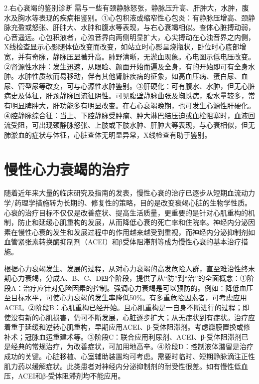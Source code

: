 2.右心衰竭的鉴别诊断
需与一些有颈静脉怒张，静脉压升高、肝肿大，水肿，腹水及胸水等表现的疾病相鉴别。①心包积液或缩窄性心包炎：有静脉压增高、颈静脉充盈或怒张、肝肿大、水肿和腹水等表现，与右心衰竭相似。查体心脏搏动弱，心音遥远。心包积液者，心浊音界向两侧明显扩大，心尖搏动在心浊音界之内侧，X线检查显示心影随体位改变而改变，如站立时心影呈烧瓶状，卧位时心底部增宽，并有奇脉，静脉压显著升高。肺野清晰，无淤血现象。心电图示低电压改变。②肾源性水肿：发生迅速，从眼睑、颜面开始而遍及全身，有的开始即可有全身水肿。水肿性质软而易移动，伴有其他肾脏疾病的征象，如高血压病、蛋白尿、血尿、管型尿等改变，可与心源性水肿鉴别。③肝硬化：可有腹水、水肿，但无心脏病史及体征，肝颈静脉回流征阴性。可见腹壁静脉曲张及蜘蛛痣，腹水量较多，常有明显脾肿大，肝功能多有明显改变。在右心衰竭晚期，也可发生心源性肝硬化。④腔静脉综合征：当上、下腔静脉受肿瘤、肿大淋巴结压迫或血栓阻塞时，血液回流受阻，可出现颈静脉怒张、上肢或下肢水肿、肝肿大等表现，与心衰相似，但无肺淤血的症状与体征，心脏查体无明显异常，X线检查有助于鉴别。

\protect\hypertarget{text00074.html}{}{}

\section{慢性心力衰竭的治疗}

随着近年来大量的临床研究及指南的发表，慢性心衰的治疗已逐步从短期血流动力学/药理学措施转为长期的、修复性的策略，目的是改变衰竭心脏的生物学性质。心衰的治疗目标不仅仅是改善症状、提高生活质量，更重要的是针对心肌重构的机制，防止和延缓心肌重构的发展，从而降低心衰的死亡率和住院率。神经内分泌因素在慢性心衰的发生和发展过程中的作用越来越受到重视，而神经内分泌抑制剂如血管紧张素转换酶抑制剂（ACEI）和β受体阻滞剂等成为慢性心衰的基本治疗措施。

根据心力衰竭发生、发展的过程，从对心力衰竭的高发危险人群，直至难治性终末期心力衰竭，分成A、B、C、D四个阶段，提供了从“防”到“治”的全面概念：①阶段A：治疗应针对危险因素的控制。强调心力衰竭是可以预防的。例如：降低血压至目标水平，可使心力衰竭的发生率降低50\%。有多重危险因素者，可考虑应用ACEI。②阶段B：心肌重构已经开始。且心肌重构是一自身不断进行的过程；即使没有新的心肌损害，仍可不断发展，心脏逐步扩大；从无症状到有症状。治疗应着重于延缓和逆转心肌重构，早期应用ACEI、β-受体阻滞剂。考虑瓣膜置换或修补术；冠脉血运重建术等。③阶段C：联合应用利尿剂、ACEI、β-受体阻滞剂已是经典的常规治疗，为改善症状，可加用地高辛。④阶段D：控制液体潴留是治疗成功的关键。心脏移植、心室辅助装置均可考虑。需要时临时、短期静脉滴注正性肌力药以缓解症状。此类患者对神经内分泌抑制剂的耐受性很差。如有慢性低血压，ACEI和β-受体阻滞剂均不能应用。

